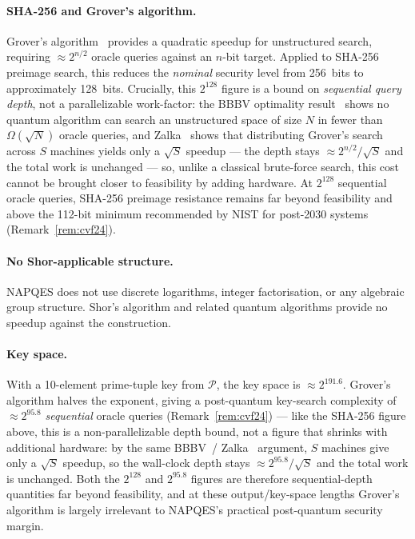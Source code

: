 \documentclass[11pt,a4paper]{article}
\begin{document}
\paragraph{SHA-256 and Grover's algorithm.}
Grover's algorithm~\cite{grover96} provides a quadratic speedup for
unstructured search, requiring $\approx 2^{n/2}$ oracle queries against an
$n$-bit target. Applied to SHA-256 preimage search, this reduces the
\emph{nominal} security level from 256~bits to approximately 128~bits.
Crucially, this $2^{128}$ figure is a bound on \emph{sequential query
depth}, not a parallelizable work-factor: the BBBV optimality
result~\cite{bbbv1997} shows no quantum algorithm can search an
unstructured space of size $N$ in fewer than $\Omega(\sqrt{N})$ oracle
queries, and Zalka~\cite{zalka1999} shows that distributing Grover's
search across $S$ machines yields only a $\sqrt{S}$ speedup --- the depth
stays $\approx 2^{n/2}/\sqrt{S}$ and the total work is unchanged --- so,
unlike a classical brute-force search, this cost cannot be brought closer
to feasibility by adding hardware. At $2^{128}$ sequential oracle queries,
SHA-256 preimage resistance remains far beyond feasibility and above the
112-bit minimum recommended by NIST for post-2030 systems
(Remark~\ref{rem:cvf24}).

\paragraph{No Shor-applicable structure.}
NAPQES does not use discrete logarithms, integer factorisation, or any
algebraic group structure.  Shor's algorithm and related quantum algorithms
provide no speedup against the construction.

\paragraph{Key space.}
With a 10-element prime-tuple key from $\mathcal{P}$, the key space is
$\approx 2^{191.6}$.  Grover's algorithm halves the exponent, giving a
post-quantum key-search complexity of $\approx 2^{95.8}$ \emph{sequential}
oracle queries (Remark~\ref{rem:cvf24}) --- like the SHA-256 figure
above, this is a non-parallelizable depth bound, not a figure that
shrinks with additional hardware: by the same BBBV~\cite{bbbv1997}/
Zalka~\cite{zalka1999} argument, $S$ machines give only a $\sqrt{S}$
speedup, so the wall-clock depth stays $\approx 2^{95.8}/\sqrt{S}$ and the
total work is unchanged. Both the $2^{128}$ and $2^{95.8}$ figures are
therefore sequential-depth quantities far beyond feasibility, and at
these output/key-space lengths Grover's algorithm is largely irrelevant
to NAPQES's practical post-quantum security margin.
\end{document}

